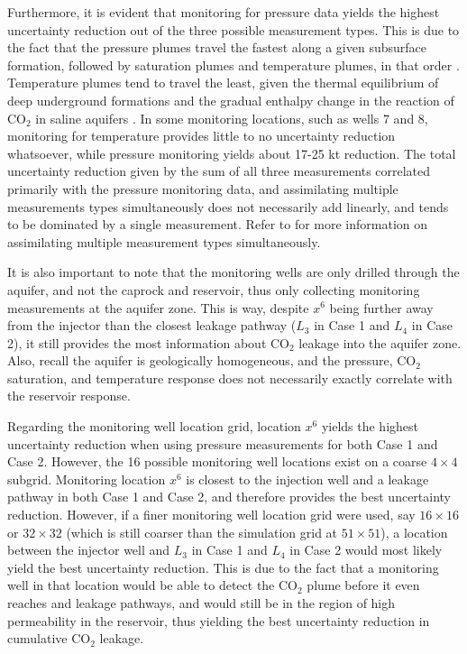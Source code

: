 \documentclass[a4paper,fleqn]{cas-sc}
\begin{document}
Furthermore, it is evident that monitoring for pressure data yields the highest uncertainty reduction out of the three possible measurement types. This is due to the fact that the pressure plumes travel the fastest along a given subsurface formation, followed by saturation plumes and temperature plumes, in that order \citep{Chadwick2006303}. Temperature plumes tend to travel the least, given the thermal equilibrium of deep underground formations and the gradual enthalpy change in the reaction of CO$_2$ in saline aquifers \citep{koschel2006enthalpy}. In some monitoring locations, such as wells 7 and 8, monitoring for temperature provides little to no uncertainty reduction whatsoever, while pressure monitoring yields about 17-25 kt reduction. The total uncertainty reduction given by the sum of all three measurements correlated primarily with the pressure monitoring data, and assimilating multiple measurements types simultaneously does not necessarily add linearly, and tends to be dominated by a single measurement. Refer to \citet{Chen2018} for more information on assimilating multiple measurement types simultaneously.

It is also important to note that the monitoring wells are only drilled through the aquifer, and not the caprock and reservoir, thus only collecting monitoring measurements at the aquifer zone. This is way, despite $x^6$ being further away from the injector than the closest leakage pathway ($L_3$ in Case 1 and $L_4$ in Case 2), it still provides the most information about CO$_2$ leakage into the aquifer zone. Also, recall the aquifer is geologically homogeneous, and the pressure, CO$_2$ saturation, and temperature response does not necessarily exactly correlate with the reservoir response.

Regarding the monitoring well location grid, location $x^6$ yields the highest uncertainty reduction when using pressure measurements for both Case 1 and Case 2. However, the 16 possible monitoring well locations exist on a coarse $4\times 4$ subgrid. Monitoring location $x^6$ is closest to the injection well and a leakage pathway in both Case 1 and Case 2, and therefore provides the best uncertainty reduction. However, if a finer monitoring well location grid were used, say $16 \times 16$ or $32 \times 32$ (which is still coarser than the simulation grid at $51 \times 51$), a location between the injector well and $L_3$ in Case 1 and $L_4$ in Case 2 would most likely yield the best uncertainty reduction. This is due to the fact that a monitoring well in that location would be able to detect the CO$_2$ plume before it even reaches and leakage pathways, and would still be in the region of high permeability in the reservoir, thus yielding the best uncertainty reduction in cumulative CO$_2$ leakage. 
\end{document}
